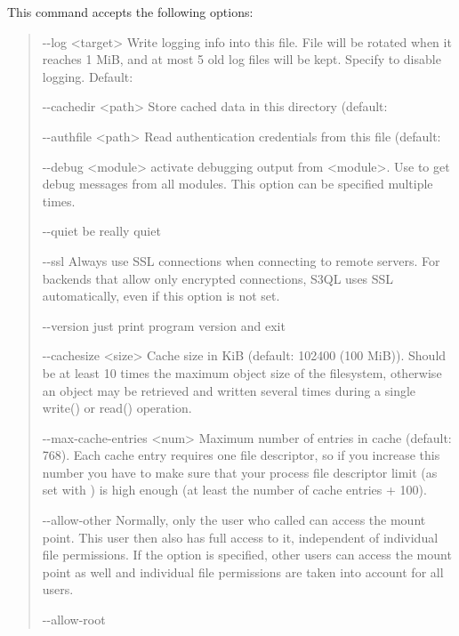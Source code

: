 \documentclass[letterpaper,10pt,english]{sphinxmanual}
\begin{document}
This command accepts the following options:
\begin{quote}
\begin{optionlist}{3cm}
\item [-{-}log \textless{}target\textgreater{}]  
Write logging info into this file. File will be
rotated when it reaches 1 MiB, and at most 5 old log
files will be kept. Specify  to disable
logging. Default: 
\item [-{-}cachedir \textless{}path\textgreater{}]  
Store cached data in this directory (default:
\item [-{-}authfile \textless{}path\textgreater{}]  
Read authentication credentials from this file
(default: 
\item [-{-}debug \textless{}module\textgreater{}]  
activate debugging output from \textless{}module\textgreater{}. Use  to
get debug messages from all modules. This option can
be specified multiple times.
\item [-{-}quiet]  
be really quiet
\item [-{-}ssl]  
Always use SSL connections when connecting to remote
servers. For backends that allow only encrypted
connections, S3QL uses SSL automatically, even if this
option is not set.
\item [-{-}version]  
just print program version and exit
\item [-{-}cachesize \textless{}size\textgreater{}]  
Cache size in KiB (default: 102400 (100 MiB)). Should
be at least 10 times the maximum object size of the
filesystem, otherwise an object may be retrieved and
written several times during a single write() or
read() operation.
\item [-{-}max-cache-entries \textless{}num\textgreater{}]  
Maximum number of entries in cache (default: 768).
Each cache entry requires one file descriptor, so if
you increase this number you have to make sure that
your process file descriptor limit (as set with
) is high enough (at least the number of
cache entries + 100).
\item [-{-}allow-other]  
Normally, only the user who called  can
access the mount point. This user then also has full
access to it, independent of individual file
permissions. If the  option is
specified, other users can access the mount point as
well and individual file permissions are taken into
account for all users.
\item [-{-}allow-root]  

\end{optionlist}
\end{quote}
\end{document}
